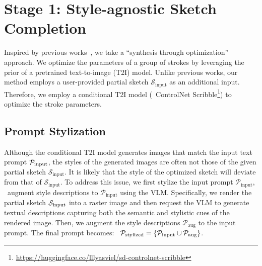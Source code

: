 \section{Stage 1: Style-agnostic Sketch Completion}
Inspired by previous works~\cite{xing2023diffsketcher,vinker2023clipascene}, we take a ``synthesis through optimization'' approach. 
We optimize the parameters of a group of strokes by leveraging the prior of a pretrained text-to-image (T2I) model.
Unlike previous works, our method employs a user-provided partial sketch $\mathcal{S}_{\text{input}}$ as an additional input.
Therefore, we employ a conditional T2I model (\eg~ControlNet Scribble\footnote{\url{https://huggingface.co/lllyasviel/sd-controlnet-scribble}}) to optimize the stroke parameters.

\subsection{Prompt Stylization}
\label{sec:method_step1}
Although the conditional T2I model generates images that match the input text prompt $\mathcal{P}_{\mathrm{input}}$, the styles of the generated images are often not those of the given partial sketch $\mathcal{S}_{\text{input}}$.
It is likely that the style of the optimized sketch will deviate from that of $\mathcal{S}_{\text{input}}$.
To address this issue, we first stylize the input prompt $\mathcal{P}_{\text{input}}$, \ie~augment style descriptions to $\mathcal{P}_{\text{input}}$ using the VLM.
Specifically, we render the partial sketch $\mathcal{S}_{\mathrm{input}}$ into a raster image and then request the VLM to generate textual descriptions capturing both the semantic and stylistic cues of the rendered image.
Then, we augment the style descriptions $\mathcal{P}_{\text{aug}}$ to the input prompt.
The final prompt becomes: \ie~$\mathcal{P}_{\mathrm{stylized}}=\{\mathcal{P}_{\text{input}} \cup \mathcal{P}_{\text{aug}}\}$.



